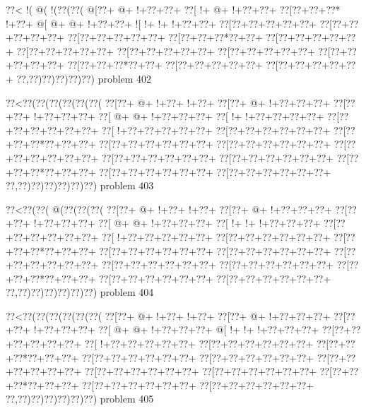 \vbox{\vbox{\goo
\0??<\- !(\- @(\- !(\0??(\0??(
\- @[\0??+\- @+\- !+\0??+\0??+
\0??[\- !+\- @+\- !+\0??+\0??+
\0??[\0??+\0??+\0??*\- !+\0??+
\- @[\- @+\- @+\- !+\0??+\0??+
\- ![\- !+\- !+\- !+\0??+\0??+
\0??[\0??+\0??+\0??+\0??+\0??+
\0??[\0??+\0??+\0??+\0??+\0??+
\0??[\0??+\0??+\0??+\0??+\0??+
\0??[\0??+\0??+\0??*\0??+\0??+
\0??[\0??+\0??+\0??+\0??+\0??+
\0??[\0??+\0??+\0??+\0??+\0??+
\0??[\0??+\0??+\0??+\0??+\0??+
\0??[\0??+\0??+\0??+\0??+\0??+
\0??[\0??+\0??+\0??+\0??+\0??+
\0??[\0??+\0??+\0??*\0??+\0??+
\0??[\0??+\0??+\0??+\0??+\0??+
\0??[\0??+\0??+\0??+\0??+\0??+
\0??,\0??)\0??)\0??)\0??)\0??)
}
\hfil problem 402\hfil\break
}

\vbox{\vbox{\goo
\0??<\0??(\0??(\0??(\0??(\0??(\0??(
\0??[\0??+\- @+\- !+\0??+\- !+\0??+
\0??[\0??+\- @+\- !+\0??+\0??+\0??+
\0??[\0??+\0??+\- !+\0??+\0??+\0??+
\0??[\- @+\- @+\- !+\0??+\0??+\0??+
\0??[\- !+\- !+\0??+\0??+\0??+\0??+
\0??[\0??+\0??+\0??+\0??+\0??+\0??+
\0??[\- !+\0??+\0??+\0??+\0??+\0??+
\0??[\0??+\0??+\0??+\0??+\0??+\0??+
\0??[\0??+\0??+\0??*\0??+\0??+\0??+
\0??[\0??+\0??+\0??+\0??+\0??+\0??+
\0??[\0??+\0??+\0??+\0??+\0??+\0??+
\0??[\0??+\0??+\0??+\0??+\0??+\0??+
\0??[\0??+\0??+\0??+\0??+\0??+\0??+
\0??[\0??+\0??+\0??+\0??+\0??+\0??+
\0??[\0??+\0??+\0??*\0??+\0??+\0??+
\0??[\0??+\0??+\0??+\0??+\0??+\0??+
\0??[\0??+\0??+\0??+\0??+\0??+\0??+
\0??,\0??)\0??)\0??)\0??)\0??)\0??)
}
\hfil problem 403\hfil\break
}

\vbox{\vbox{\goo
\0??<\0??(\0??(\- @(\0??(\0??(\0??(
\0??[\0??+\- @+\- !+\0??+\- !+\0??+
\0??[\0??+\- @+\- !+\0??+\0??+\0??+
\0??[\0??+\0??+\- !+\0??+\0??+\0??+
\0??[\- @+\- @+\- !+\0??+\0??+\0??+
\0??[\- !+\- !+\- !+\0??+\0??+\0??+
\0??[\0??+\0??+\0??+\0??+\0??+\0??+
\0??[\- !+\0??+\0??+\0??+\0??+\0??+
\0??[\0??+\0??+\0??+\0??+\0??+\0??+
\0??[\0??+\0??+\0??*\0??+\0??+\0??+
\0??[\0??+\0??+\0??+\0??+\0??+\0??+
\0??[\0??+\0??+\0??+\0??+\0??+\0??+
\0??[\0??+\0??+\0??+\0??+\0??+\0??+
\0??[\0??+\0??+\0??+\0??+\0??+\0??+
\0??[\0??+\0??+\0??+\0??+\0??+\0??+
\0??[\0??+\0??+\0??*\0??+\0??+\0??+
\0??[\0??+\0??+\0??+\0??+\0??+\0??+
\0??[\0??+\0??+\0??+\0??+\0??+\0??+
\0??,\0??)\0??)\0??)\0??)\0??)\0??)
}
\hfil problem 404\hfil\break
}

\vbox{\vbox{\goo
\0??<\0??(\0??(\0??(\0??(\0??(\0??(
\0??[\0??+\- @+\- !+\0??+\- !+\0??+
\0??[\0??+\- @+\- !+\0??+\0??+\0??+
\0??[\0??+\0??+\- !+\0??+\0??+\0??+
\0??[\- @+\- @+\- !+\0??+\0??+\0??+
\- @[\- !+\- !+\- !+\0??+\0??+\0??+
\0??[\0??+\0??+\0??+\0??+\0??+\0??+
\0??[\- !+\0??+\0??+\0??+\0??+\0??+
\0??[\0??+\0??+\0??+\0??+\0??+\0??+
\0??[\0??+\0??+\0??*\0??+\0??+\0??+
\0??[\0??+\0??+\0??+\0??+\0??+\0??+
\0??[\0??+\0??+\0??+\0??+\0??+\0??+
\0??[\0??+\0??+\0??+\0??+\0??+\0??+
\0??[\0??+\0??+\0??+\0??+\0??+\0??+
\0??[\0??+\0??+\0??+\0??+\0??+\0??+
\0??[\0??+\0??+\0??*\0??+\0??+\0??+
\0??[\0??+\0??+\0??+\0??+\0??+\0??+
\0??[\0??+\0??+\0??+\0??+\0??+\0??+
\0??,\0??)\0??)\0??)\0??)\0??)\0??)
}
\hfil problem 405\hfil\break
}

